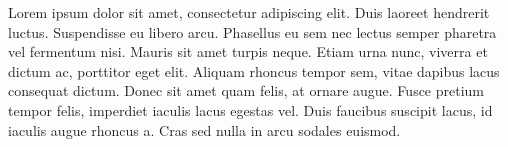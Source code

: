 \documentclass[final,conference,10pt]{IEEEtran}
\begin{document}
Lorem ipsum dolor sit amet, consectetur adipiscing elit. Duis laoreet hendrerit luctus. Suspendisse eu libero arcu. Phasellus eu sem nec lectus semper pharetra vel fermentum nisi. Mauris sit amet turpis neque. Etiam urna nunc, viverra et dictum ac, porttitor eget elit. Aliquam rhoncus tempor sem, vitae dapibus lacus consequat dictum. Donec sit amet quam felis, at ornare augue. Fusce pretium tempor felis, imperdiet iaculis lacus egestas vel. Duis faucibus suscipit lacus, id iaculis augue rhoncus a. Cras sed nulla in arcu sodales euismod.



\pagebreak
\end{document}
